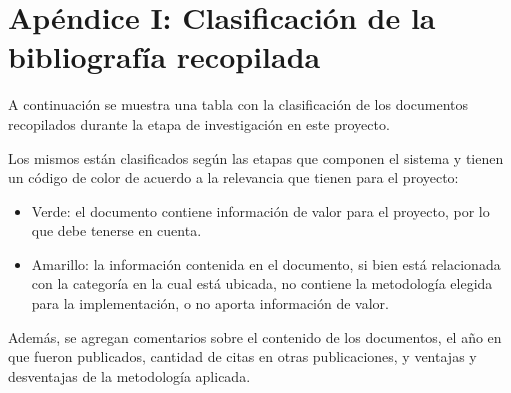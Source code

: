 \section{Apéndice I: Clasificación de la bibliografía recopilada}
\label{tablabiblio}
A continuación se muestra una tabla con la clasificación de los documentos recopilados durante la etapa de investigación en este proyecto.

Los mismos están clasificados según las etapas que componen el sistema y tienen un código de color de acuerdo a la relevancia que tienen para el proyecto:
\begin{itemize}
	\item Verde: el documento contiene información de valor para el proyecto, por lo que debe tenerse en cuenta.
	\item Amarillo: la información contenida en el documento, si bien está relacionada con la categoría en la cual está ubicada, no contiene la metodología elegida para la implementación, o no aporta información de valor. 
\end{itemize}

Además, se agregan comentarios sobre el contenido de los documentos, el año en que fueron publicados, cantidad de citas en otras publicaciones, y ventajas y desventajas de la metodología aplicada.


